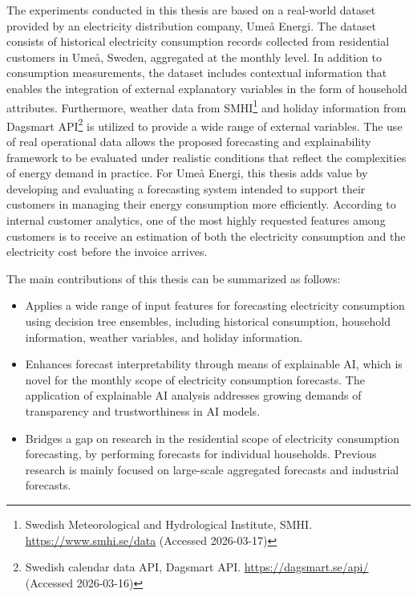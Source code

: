 The experiments conducted in this thesis are based on a real-world dataset provided by an electricity distribution company, Umeå Energi. The dataset consists of historical electricity consumption records collected from residential customers in Umeå, Sweden, aggregated at the monthly level. In addition to consumption measurements, the dataset includes contextual information that enables the integration of external explanatory variables in the form of household attributes. Furthermore, weather data from SMHI\footnote{Swedish Meteorological and Hydrological Institute, SMHI. \url{https://www.smhi.se/data} (Accessed 2026-03-17)} and holiday information from Dagsmart API\footnote{Swedish calendar data API, Dagsmart API. \url{https://dagsmart.se/api/} (Accessed 2026-03-16)} is utilized to provide a wide range of external variables. The use of real operational data allows the proposed forecasting and explainability framework to be evaluated under realistic conditions that reflect the complexities of energy demand in practice. %
For Umeå Energi, this thesis adds value by developing and evaluating a forecasting system intended to support their customers in managing their energy consumption more efficiently. According to internal customer analytics, one of the most highly requested features among customers is to receive an estimation of both the electricity consumption and the electricity cost before the invoice arrives. %

The main contributions of this thesis can be summarized as follows:
\begin{itemize}
    \item Applies a wide range of input features for forecasting electricity consumption using decision tree ensembles, including historical consumption, household information, weather variables, and holiday information.
    \item Enhances forecast interpretability through means of explainable AI, which is novel for the monthly scope of electricity consumption forecasts. The application of explainable AI analysis addresses growing demands of transparency and trustworthiness in AI models.
    \item Bridges a gap on research in the residential scope of electricity consumption forecasting, by performing forecasts for individual households. Previous research is mainly focused on large-scale aggregated forecasts and industrial forecasts.
\end{itemize}